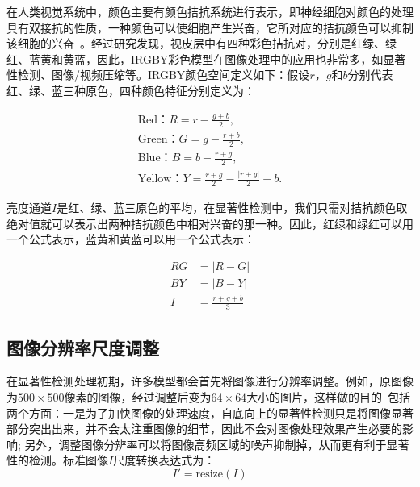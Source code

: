 在人类视觉系统中，颜色主要有颜色拮抗系统进行表示，即神经细胞对颜色的处理具有双接抗的性质，一种颜色可以使细胞产生兴奋，它所对应的拮抗颜色可以抑制该细胞的兴奋~\cite{Engel1997Colour}。经过研究发现，视皮层中有四种彩色拮抗对，分别是红绿、绿红、蓝黄和黄蓝，因此，IRGBY彩色模型在图像处理中的应用也非常多，如显著性检测、图像/视频压缩等。IRGBY颜色空间定义如下：假设$r$，$g$和$b$分别代表红、绿、蓝三种原色，四种颜色特征分别定义为：
\begin{linenomath}
\begin{align}
\textrm{Red：$R=r-\frac{g+b}{2}$,}\label{式2_6}\\
\textrm{Green：$G=g-\frac{r+b}{2}$,}\label{式2_7}\\
\textrm{Blue：$B=b-\frac{r+g}{2}$,}\label{式2_8}\\
\textrm{Yellow：$Y=\frac{r+g}{2}-\frac{|r+g|}{2}-b$.}\label{式2_9}
\end{align}
\end{linenomath}
亮度通道$I$是红、绿、蓝三原色的平均，在显著性检测中，我们只需对拮抗颜色取绝对值就可以表示出两种拮抗颜色中相对兴奋的那一种。因此，红绿和绿红可以用一个公式表示，蓝黄和黄蓝可以用一个公式表示：
\begin{linenomath}
\begin{align}
RG &= \big|R-G\big|\label{式2_10}\\
BY &= \big|B-Y\big|\label{式2_11}\\
I &= \frac{r+g+b}{3}\label{式2_12}
\end{align}
\end{linenomath}

\subsection{图像分辨率尺度调整}
\label{2_1_4}

在显著性检测处理初期，许多模型都会首先将图像进行分辨率调整。例如，原图像为$500×500$像素的图像，经过调整后变为$64×64$大小的图片，这样做的目的~\cite{ZhangLiming2010Book}包括两个方面：一是为了加快图像的处理速度，自底向上的显著性检测只是将图像显著部分突出出来，并不会太注重图像的细节，因此不会对图像处理效果产生必要的影响; 另外，调整图像分辨率可以将图像高频区域的噪声抑制掉，从而更有利于显著性的检测。标准图像$I$尺度转换表达式为：
\begin{equation}
I'=\textrm{resize$(I)$}
\label{式2_13}
\end{equation}

